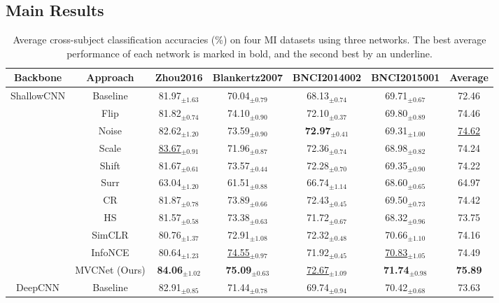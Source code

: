\documentclass[journal]{IEEEtran}
\begin{document}
\subsection{Main Results}
\begin{table*}[htpb]
\centering 
\setlength{\tabcolsep}{2mm}
\renewcommand\arraystretch{1}
\caption{Average cross-subject classification accuracies (\%) on four MI datasets using three networks. The best average performance of each network is marked in bold, and the second best by an underline.}  \label{tab:basic_results}
    \begin{tabular}{c|c|ccccc}   \toprule  
Backbone & Approach & Zhou2016 & Blankertz2007 & BNCI2014002 & BNCI2015001 & Average \\
\midrule
\multirow{11}{*}{ShallowCNN}
&Baseline & 81.97$_{\pm1.63}$ & 70.04$_{\pm0.79}$ & 68.13$_{\pm0.74}$ & 69.71$_{\pm0.67}$ & 72.46 \\
&Flip & 81.82$_{\pm0.74}$ & 74.10$_{\pm0.90}$ & 72.10$_{\pm0.37}$ & 69.80$_{\pm0.89}$ & 74.46 \\
&Noise & 82.62$_{\pm1.20}$ & 73.59$_{\pm0.90}$ & \textbf{72.97}$_{\pm0.41}$ & 69.31$_{\pm1.00}$ & \underline{74.62} \\
&Scale & \underline{83.67}$_{\pm0.91}$ & 71.96$_{\pm0.87}$ & 72.36$_{\pm0.74}$ & 68.98$_{\pm0.82}$ & 74.24 \\
&Shift & 81.67$_{\pm0.61}$ & 73.57$_{\pm0.44}$ & 72.28$_{\pm0.70}$ & 69.35$_{\pm0.90}$ & 74.22 \\
&Surr & 63.04$_{\pm1.20}$ & 61.51$_{\pm0.88}$ & 66.74$_{\pm1.14}$ & 68.60$_{\pm0.65}$ & 64.97 \\
&CR & 81.87$_{\pm0.78}$ & 73.89$_{\pm0.66}$ & 72.43$_{\pm0.45}$ & 69.50$_{\pm0.73}$ & 74.42 \\
&HS & 81.57$_{\pm0.58}$ & 73.38$_{\pm0.63}$ & 71.72$_{\pm0.67}$ & 68.32$_{\pm0.96}$ & 73.75 \\
&SimCLR & 80.76$_{\pm1.37}$ & 72.91$_{\pm1.08}$ & 72.32$_{\pm0.48}$ & 70.66$_{\pm1.10}$ & 74.16 \\
&InfoNCE & 80.64$_{\pm1.23}$ & \underline{74.55}$_{\pm0.97}$ & 71.92$_{\pm0.45}$ & \underline{70.83}$_{\pm1.05}$ & 74.49 \\
&MVCNet (Ours) & \textbf{84.06}$_{\pm1.02}$ & \textbf{75.09}$_{\pm0.63}$ & \underline{72.67}$_{\pm1.09}$ & \textbf{71.74}$_{\pm0.98}$ & \textbf{75.89} \\
\midrule
\multirow{11}{*}{DeepCNN}
&Baseline & 82.91$_{\pm0.85}$ & 71.44$_{\pm0.78}$ & 69.74$_{\pm0.94}$ & 70.42$_{\pm0.68}$ & 73.63 \\

\end{tabular}
\end{table*}
\end{document}
